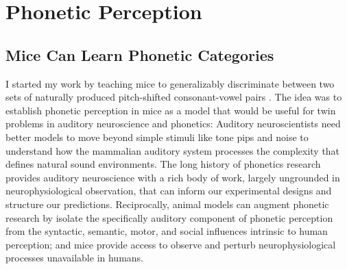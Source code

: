 \section{Phonetic Perception}
\label{sec:phonemes}
\subsection{Mice Can Learn Phonetic Categories}

I started my work by teaching mice to generalizably discriminate between two sets of naturally produced pitch-shifted consonant-vowel pairs \cite{saundersMiceCanLearn2019}. The idea was to establish phonetic perception in mice as a model that would be useful for twin problems in auditory neuroscience and phonetics: Auditory neuroscientists need better models to move beyond simple stimuli like tone pips and noise to understand how the mammalian auditory system processes the complexity that defines natural sound environments. The long history of phonetics research provides auditory neuroscience with a rich body of work, largely ungrounded in neurophysiological observation, that can inform our experimental designs and structure our predictions. Reciprocally, animal models can augment phonetic research by isolate the specifically auditory component of phonetic perception from the syntactic, semantic, motor, and social influences intrinsic to human perception; and mice provide access to observe and perturb neurophysiological processes unavailable in humans.

